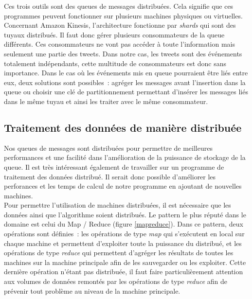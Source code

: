   Ces trois outils sont des queues de messages distribuées. Cela signifie que ces programmes peuvent fonctionner sur plusieurs machines physiques ou virtuelles. Concernant Amazon Kinesis, l'architecture fonctionne par \textit{shards} qui sont des tuyaux distribués. Il faut donc gérer plusieurs consommateurs de la queue différents. Ces consommateurs ne vont pas accéder à toute l'information mais seulement une partie des tweets. Dans notre cas, les tweets sont des événements totalement indépendants, cette multitude de consommateurs est donc sans importance. Dans le cas où les événements mis en queue pourraient être liés entre eux, deux solutions sont possibles : agréger les messages avant l'insertion dans la queue ou choisir une clé de partitionnement permettant d'insérer les messages liés dans le même tuyau et ainsi les traiter avec le même consommateur.

\subsection{Traitement des données de manière distribuée}
\label{sub:Traitement des données de manière distribuée}

  Nos queues de messages sont distribuées pour permettre de meilleures performances et une facilité dans l'amélioration de la puissance de stockage de la queue. Il est très intéressant également de travailler sur un programme de traitement des données distribué. Il serait donc possible d'améliorer les perforances et les temps de calcul de notre programme en ajoutant de nouvelles machines.\\

  Pour permettre l'utilisation de machines distribuées, il est nécessaire que les données ainsi que l'algorithme soient distribués. Le pattern le plus réputé dans le domaine est celui du Map / Reduce (figure \ref{mapreduce}). Dans ce pattern, deux opérations sont définies : les opérations de type \textit{map} qui s'exécutent en local sur chaque machine et permettent d'exploiter toute la puissance du distribué, et les opérations de type \textit{reduce} qui permettent d'agréger les résultats de toutes les machines sur la machine principale afin de les sauvegarder ou les exploiter. Cette dernière opération n'étant pas distribuée, il faut faire particulièrement attention aux volumes de données remontés par les opérations de type \textit{reduce} afin de prévenir tout problème au niveau de la machine principale.

